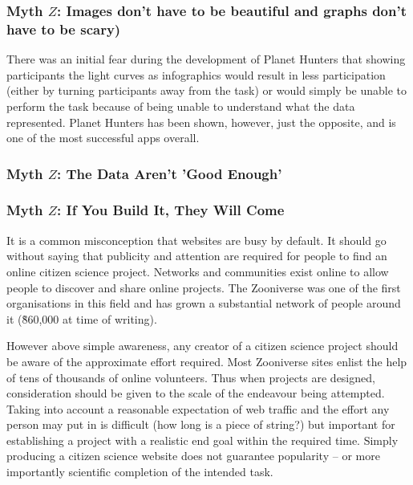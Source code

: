 \documentclass{sigchi}
\begin{document}
\subsubsection{Myth $Z$: Images don't have to be beautiful and graphs don't have to be scary)}
There was an initial fear during the development of Planet Hunters that showing participants the light curves as infographics would result in less participation (either by turning participants away from the task) or would simply be unable to perform the task because of being unable to understand what the data represented.  Planet Hunters has been shown, however, just the opposite, and is one of the most successful apps overall.  
\subsubsection{Myth $Z$: The Data Aren't 'Good Enough'}
\subsubsection{Myth $Z$: If You Build It, They Will Come}

It is a common misconception that websites are busy by default. It should go without saying that publicity and attention are required for people to find an online citizen science project. Networks and communities exist online to allow people to discover and share online projects. The Zooniverse was one of the first organisations in this field and has grown a substantial network of people around it (\~860,000 at time of writing).

However above simple awareness, any creator of a citizen science project should be aware of the approximate effort required. Most Zooniverse sites enlist the help of tens of thousands of online volunteers. Thus when projects are designed, consideration should be given to the scale of the endeavour being attempted. Taking into account a reasonable expectation of web traffic and the effort any person may put in is difficult (how long is a piece of string?) but important for establishing a project with a realistic end goal within the required time. Simply producing a citizen science website does not guarantee popularity -- or more importantly scientific completion of the intended task.

\end{document}
